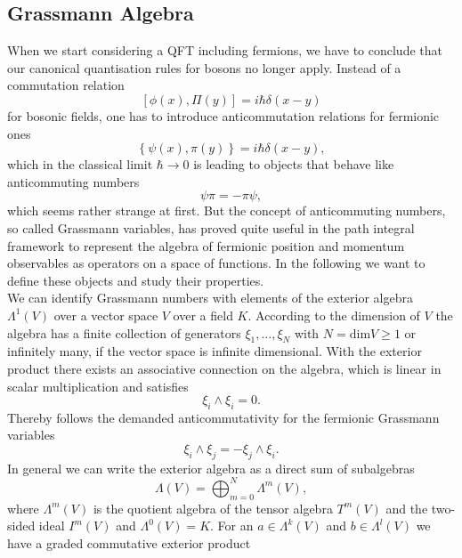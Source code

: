 \subsection{Grassmann Algebra}
When we start considering a QFT including fermions, we have to conclude that our canonical quantisation rules for bosons no longer apply. Instead of a commutation relation
\begin{equation}
\left[ \phi(x),\Pi(y)\right] = i \hbar \delta(x-y)
\end{equation}
for bosonic fields, one has to introduce anticommutation relations for fermionic ones \cite{Cartier:2002zp}
\begin{equation}
\left\lbrace \psi(x),\pi(y) \right\rbrace = i \hbar \delta(x-y),
\end{equation}
which in the classical limit $\hbar \rightarrow 0$ is leading to objects that behave like anticommuting numbers
\begin{equation}
\psi\pi = -\pi\psi,
\end{equation}
which seems rather strange at first. But the concept of anticommuting numbers, so called Grassmann variables, has proved quite useful in the path integral framework to represent the algebra of fermionic position and momentum observables as operators on a space of functions. In the following we want to define these objects and study their properties.\\[1cm]
%
%
We can identify Grassmann numbers with elements of the exterior algebra $\Lambda^{1}(V)$ over a vector space $V$ over a field $K$. According to the dimension of $V$ the algebra has a finite collection of generators $\xi_{1},\ldots,\xi_{N}$ with $N=\text{dim}V \geq 1$ or infinitely many, if the vector space is infinite dimensional. With the exterior product there exists an associative connection on the algebra, which is linear in scalar multiplication and satisfies
\begin{equation}
\xi_{i}\wedge \xi_{i} =0.
\label{wedge_zero}
\end{equation}
Thereby follows the demanded anticommutativity for the fermionic Grassmann variables
\begin{equation}
\xi_{i}\wedge\xi_{j} = - \xi_{j}\wedge\xi_{i}.
\end{equation}
In general we can write the exterior algebra as a direct sum of subalgebras
\begin{equation}
\Lambda(V)=\bigoplus_{m=0}^{N} \Lambda^{m}(V),
\end{equation}
where $\Lambda^{m}(V)$ is the quotient algebra of the tensor algebra $T^{m}(V)$ and the two-sided ideal $I^{m}(V)$ and $\Lambda^{0}(V)=K$. For an $a \in \Lambda^{k}(V)$ and $b \in \Lambda^{l}(V)$ we have a graded commutative exterior product
